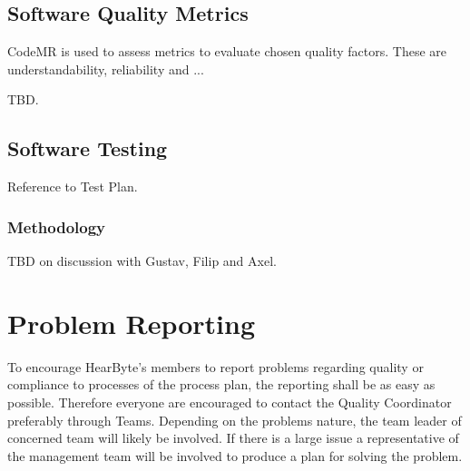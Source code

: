 \documentclass{article}
\begin{document}
	\subsection{Software Quality Metrics}
	
	
	CodeMR is used to assess metrics to evaluate chosen quality factors. These are understandability, reliability and ...
	
	TBD.
	
	\subsection{Software Testing}
	Reference to Test Plan. %
	
	\subsubsection{Methodology}
	TBD on discussion with Gustav, Filip and Axel.
	
		
	 

	\clearpage
	\section{Problem Reporting}
	To encourage HearByte's members to report problems regarding quality or compliance to processes of the process plan, the reporting shall be as easy as possible. Therefore everyone are encouraged to contact the Quality Coordinator preferably through Teams. Depending on the problems nature, the team leader of concerned team will likely be involved. If there is a large issue a representative of the management team will be involved to produce a plan for solving the problem.
	
	
\end{document}

